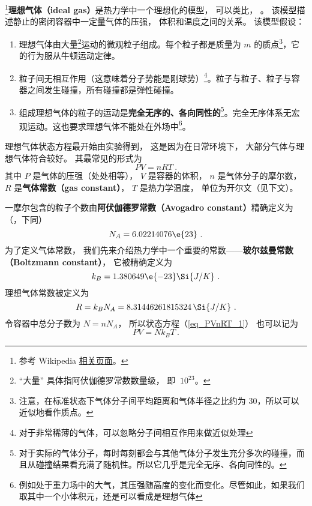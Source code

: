 

\footnote{参考 Wikipedia \href{https://en.wikipedia.org/wiki/Ideal_gas}{相关页面}。}\textbf{理想气体（ideal gas）}是热力学中一个理想化的模型， 可以类比， 。 该模型描述静止的密闭容器中一定量气体的压强， 体积和温度之间的关系。 该模型假设：
\begin{enumerate}
\item 理想气体由大量\footnote{“大量” 具体指阿伏伽德罗常数数量级， 即 $~10^{23}$。}运动的微观粒子组成。每个粒子都是质量为 $m$ 的质点\footnote{注意，在标准状态下气体分子间平均距离和气体半径之比约为 $30$，所以可以近似地看作质点。}，它的行为服从牛顿运动定律。

\item 粒子间无相互作用（这意味着分子势能是刚球势）\footnote{对于非常稀薄的气体，可以忽略分子间相互作用来做近似处理}。粒子与粒子、粒子与容器之间发生碰撞，所有碰撞都是弹性碰撞。

\item 组成理想气体的粒子的运动是\textbf{完全无序的、各向同性的}\footnote{对于实际的气体分子，每时每刻都会与其他气体分子发生充分多次的碰撞，而且从碰撞结果看充满了随机性。所以它几乎是完全无序、各向同性的。}。完全无序体系无宏观运动。这也要求理想气体不能处在外场中\footnote{例如处于重力场中的大气，其压强随高度的变化而变化。尽管如此，如果我们取其中一个小体积元，还是可以看成是理想气体}。
\end{enumerate}

理想气体状态方程最开始由实验得到， 这是因为在日常环境下， 大部分气体与理想气体符合较好。 其最常见的形式为
\begin{equation}\label{eq_PVnRT_1}
PV = nRT~.
\end{equation}
其中 $P$ 是气体的压强（处处相等）， $V$ 是容器的体积， $n$ 是气体分子的摩尔数， $R$ 是\textbf{气体常数（gas constant）}， $T$ 是热力学温度， 单位为开尔文（见下文）。

一摩尔包含的粒子个数由\textbf{阿伏伽德罗常数（Avogadro constant）}精确定义为（，下同）
\begin{equation}
N_A = 6.02214076\e{23}~.
\end{equation}
为了定义气体常数， 我们先来介绍热力学中一个重要的常数——\textbf{玻尔兹曼常数（Boltzmann constant）}， 它被精确定义为
\begin{equation}
k_B = 1.380649\e{-23} \Si{J/K}~.
\end{equation}
理想气体常数被定义为
\begin{equation}\label{eq_PVnRT_2}
R = k_B N_A = 8.31446261815324 \,\Si{J/K}~.
\end{equation}
令容器中总分子数为 $N = n N_A$， 所以状态方程（\autoref{eq_PVnRT_1}） 也可以记为
\begin{equation}\label{eq_PVnRT_4}
PV = N k_B T~.
\end{equation}

